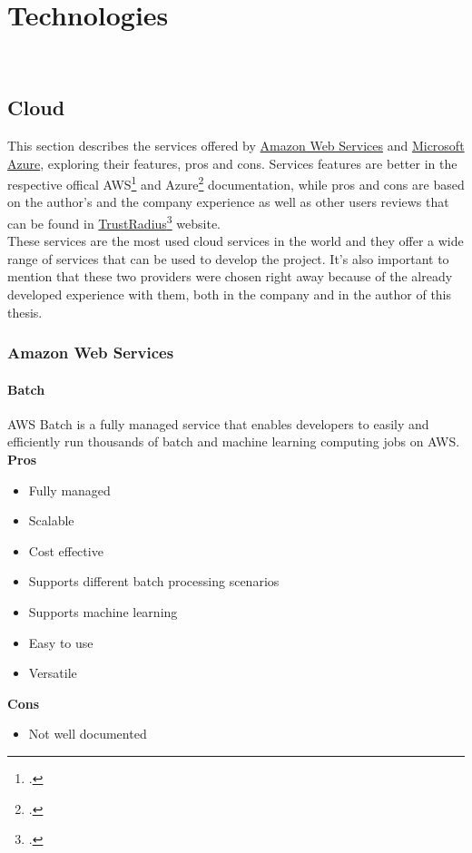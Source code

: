 \chapter{Technologies}
\label{cap:technologies}

\\

\section{Cloud}
This section describes the services offered by \href{https://aws.amazon.com/it/}{Amazon Web Services} and \href{https://azure.microsoft.com/it-it/}{Microsoft Azure}, exploring their features, pros and cons. 
Services features are better in the respective offical AWS\footcite{site:aws-docs} and Azure\footcite{site:azure-docs} documentation, 
while pros and cons are based on the author's and the company experience as well as other users reviews that can be found in 
\href{https://www.trustradius.com/}{TrustRadius}\footcite{site:trust-radius} website.\\
These services are the most used cloud services in the world and they offer a wide range of services that can be used to develop the project.
It's also important to mention that these two providers were chosen right away because of the already developed experience with them, both in the company and in the author of this thesis.
    \subsection{Amazon Web Services}

        \subsubsection{Batch}
        \label{aws:batch}
        AWS Batch is a fully managed service that enables developers to easily and efficiently run thousands of batch and machine learning computing jobs on AWS.\\
        \textbf{Pros}
        \begin{itemize}
            \item Fully managed
            \item Scalable
            \item Cost effective
            \item Supports different batch processing scenarios
            \item Supports machine learning
            \item Easy to use
            \item Versatile
        \end{itemize}
        \textbf{Cons}
        \begin{itemize}
            \item Not well documented
        \end{itemize}

